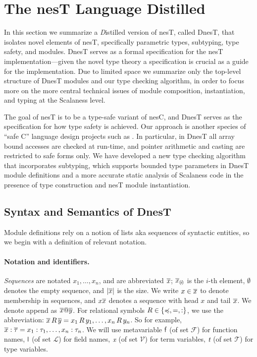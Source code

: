 \section{The nesT Language Distilled}
\label{section-nest}

In this section we summarize a \textit{D}istilled version of nesT, called DnesT, that isolates
novel elements of nesT, specifically parametric types, subtyping, type safety, and modules.
DnesT serves as a formal specification for the nesT implementation---given the novel type theory
a specification is crucial as a guide for the implementation.
Due to limited space we summarize only the top-level structure of DnesT modules and our type
checking algorithm, in order to focus more on the more central technical issues of module
composition, instantiation, and typing at the Scalaness level.

The goal of nesT is to be a type-safe variant of nesC, and DnesT serves as the specification for
how type safety is achieved. Our approach is another species of ``safe C'' language design
projects such as \cite{ccured02}. In particular, in DnesT all array bound accesses are checked
at run-time, and pointer arithmetic and casting are restricted to safe forms only. We have
developed a new type checking algorithm that incorporates subtyping, which supports bounded type
parameters in DnesT module definitions and a more accurate static analysis of Scalaness code in
the presence of type construction and nesT module instantiation.

\subsection{Syntax and Semantics of DnesT}

Module definitions rely on a notion of lists aka sequences of syntactic entities, so we begin
with a definition of relevant notation.

\paragraph{Notation and identifiers.} \emph{Sequences} are notated $x_1,\ldots,x_n$, and are
abbreviated $\overline{x}$; $\overline{x}_{(\mskip -2.5mu i\mskip -2.5mu)}$ is the $i$-th element, $\emptyset$ denotes the
empty sequence, and $|\overline{x}|$ is the size. We write $x \in \overline{x}$ to denote membership
in sequences, and $x\overline{x}$ denotes a sequence with head $x$ and tail $\overline{x}$. We denote
append as $\overline{x}@\overline{y}$. For relational symbols $R \in \{ \preccurlyeq, =, : \}$, we use the
abbreviation: $\overline{x}\, R\, \overline{y} = x_1\, R\, y_1, \ldots, x_n\, R\, y_n$. So for example,
$\overline{x} : \overline{\tau} = x_1 : \tau_1,\ldots,x_n : \tau_n$.
%
We will use metavariable $\textsf{f}$ (of set $\mathcal{F}$) for function names, $\textsf{l}$ (of set
$\mathcal{L}$) for field names, $\textit{x}$ (of set $\mathcal{V}$) for term variables, $\textit{t}$ (of
set $\mathcal{T}$) for type variables.

